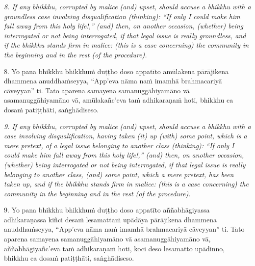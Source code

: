 \documentclass[11pt]{article}
\begin{document}
\begin{paracol}{2}
\begin{column}
\begin{flushleft}
\switchcolumn*
\end{flushleft}

{\itshape\footnotesize
8. If any bhikkhu, corrupted by malice (and) upset, should accuse a bhikkhu with a groundless case involving disqualification (thinking): “If only I could make him fall away from this holy life!,” (and) then, on another occasion, (whether) being interrogated or not being interrogated, if that legal issue is really groundless, and if the bhikkhu stands firm in malice: (this is a case concerning) the community in the beginning and in the rest (of the procedure).
}
\switchcolumn

\begin{flushleft}
8. Yo pana bhikkhu bhikkhuṁ duṭṭho doso appatīto amūlakena pārājikena dhammena anuddhaṁseyya, “App’eva nāma naṁ imamhā brahmacariyā cāveyyan” ti. Tato aparena samayena samanuggāhiyamāno vā asamanuggāhiyamāno vā, amūlakañc’eva taṁ adhikaraṇaṁ hoti, bhikkhu ca dosaṁ patiṭṭhāti, saṅghādiseso.
\switchcolumn*
\end{flushleft}

{\itshape\footnotesize
9. If any bhikkhu, corrupted by malice (and) upset, should accuse a bhikkhu with a case involving disqualification, having taken (it) up (with) some point, which is a mere pretext, of a legal issue belonging to another class (thinking): “If only I could make him fall away from this holy life!,” (and) then, on another occasion, (whether) being interrogated or not being interrogated, if that legal issue is really belonging to another class, (and) some point, which a mere pretext, has been taken up, and if the bhikkhu stands firm in malice: (this is a case concerning) the community in the beginning and in the rest (of the procedure).
}
\switchcolumn

\begin{flushleft}
9. Yo pana bhikkhu bhikkhuṁ duṭṭho doso appatīto aññabhāgiyassa adhikaraṇassa kiñci desaṁ lesamattaṁ upādāya pārājikena dhammena anuddhaṁseyya, “App’eva nāma naṁ imamhā brahmacariyā cāveyyan” ti. Tato aparena samayena samanuggāhiyamāno vā asamanuggāhiyamāno vā, aññabhāgiyañc’eva taṁ adhikaraṇaṁ hoti, koci deso lesamatto upādinno, bhikkhu ca dosaṁ patiṭṭhāti, saṅghādiseso.
\switchcolumn*
\end{flushleft}


\end{column}
\end{paracol}
\end{document}
